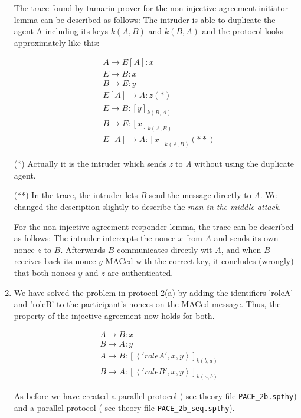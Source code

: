 \documentclass[a4paper,11pt]{scrartcl}
\newcommand{\tuple}[1]{\left\langle #1\right\rangle}
\begin{document}
\begin{enumerate}[label=\alph*)]
The trace found by tamarin-prover for the non-injective agreement initiator lemma can be described as follows: The intruder is able to duplicate the agent A including its keys $k(A,B)$ and $k(B,A)$ and the protocol looks approximately like this:

\begin{align*}
&A \rightarrow E[A]: x\\
&E \rightarrow B: x\\
&B \rightarrow E: y\\
&E[A] \rightarrow A: z (*)\\
&E \rightarrow B: [y]_{k(B,A)}\\
&B \rightarrow E: [x]_{k(A,B)}\\
&E[A]\rightarrow A: [x]_{k(A,B)} (**)
\end{align*}

(*) Actually it is the intruder which sends \emph{z} to \emph{A} without using the duplicate agent.

(**) In the trace, the intruder lets \emph{B} send the message directly to \emph{A}. We changed the description slightly to describe the \textit{man-in-the-middle attack}.

For the non-injective agreement responder lemma, the trace can be described as follows: The intruder intercepts the nonce $x$ from $A$ and sends its own nonce $z$ to $B$. Afterwards $B$ communicates directly wit $A$, and when $B$ receives back its nonce $y$ MACed with the correct key, it concludes (wrongly) that both nonces $y$ and $z$ are authenticated.

\item We have solved the problem in protocol 2(a) by adding the identifiers 'roleA' and 'roleB' to the participant's nonces on the MACed message.  Thus, the property of the injective agreement now holds for both.

\begin{align*}
&A \rightarrow B: x\\
&B \rightarrow A: y\\
&A \rightarrow B: [\tuple{'roleA', x, y}]_{k(b,a)}\\
&B \rightarrow A: [\tuple{'roleB', x, y}]_{k(a,b)}
\end{align*}

As before we have created a parallel protocol ( see theory file \texttt{PACE\_2b.spthy}) and a parallel protocol ( see theory file \texttt{PACE\_2b\_seq.spthy}).
\end{enumerate}
\end{document}

